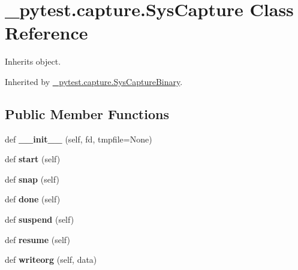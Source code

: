\hypertarget{class__pytest_1_1capture_1_1_sys_capture}{}\section{\+\_\+pytest.\+capture.\+Sys\+Capture Class Reference}
\label{class__pytest_1_1capture_1_1_sys_capture}


Inherits object.



Inherited by \hyperlink{class__pytest_1_1capture_1_1_sys_capture_binary}{\+\_\+pytest.\+capture.\+Sys\+Capture\+Binary}.

\subsection*{Public Member Functions}
\begin{DoxyCompactItemize}
\item 
\mbox{\label{class__pytest_1_1capture_1_1_sys_capture_a99a1ed9f2951a5053fd07e32bd1037b8}} 
def {\bfseries \+\_\+\+\_\+init\+\_\+\+\_\+} (self, fd, tmpfile=None)
\item 
\mbox{\label{class__pytest_1_1capture_1_1_sys_capture_acb98a19befaf2eca29be5ee060555183}} 
def {\bfseries start} (self)
\item 
\mbox{\label{class__pytest_1_1capture_1_1_sys_capture_ae945dcff9bb9fad6b6ef45acfc08a892}} 
def {\bfseries snap} (self)
\item 
\mbox{\label{class__pytest_1_1capture_1_1_sys_capture_aeb987ad112765b2217904bfed7b77d25}} 
def {\bfseries done} (self)
\item 
\mbox{\label{class__pytest_1_1capture_1_1_sys_capture_a29b97ff982e1c712d243aaa4afc4859f}} 
def {\bfseries suspend} (self)
\item 
\mbox{\label{class__pytest_1_1capture_1_1_sys_capture_a98965ba59720b638536fe6636bff46ce}} 
def {\bfseries resume} (self)
\item 
\mbox{\label{class__pytest_1_1capture_1_1_sys_capture_ada535e77984733bc2fb3301ccc1030fc}} 
def {\bfseries writeorg} (self, data)
\end{DoxyCompactItemize}

